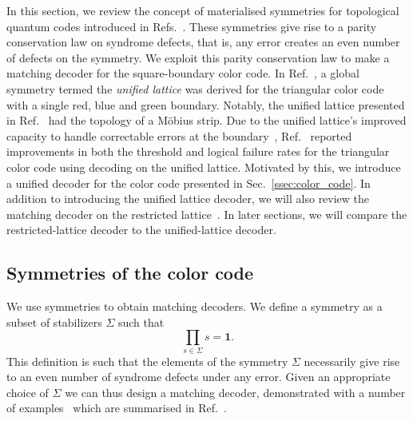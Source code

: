 \documentclass[a4paper,twocolumn,11pt,accepted=2024-12-23]{quantumarticle}
\begin{document}
In this section, we review the concept of materialised symmetries for topological quantum codes introduced in Refs.~\cite{kitaev2003fault, brown2020parallelized, sahay2022decoder,brown2022conservation}. These symmetries give rise to a parity conservation law on syndrome defects, that is, any error creates an even number of defects on the symmetry. We exploit this parity conservation law to make a matching decoder for the square-boundary color code. In Ref.~\cite{sahay2022decoder}, a global symmetry termed the \textit{unified lattice} was derived for the triangular color code with a single red, blue and green boundary. Notably, the unified lattice presented in Ref.~\cite{sahay2022decoder} had the topology of a M\"obius strip. Due to the unified lattice's improved capacity to handle correctable errors at the boundary~\cite{gidney2023newcircuitsopensource},  Ref.~\cite{sahay2022decoder} reported improvements in both the threshold and logical failure rates for the triangular color code using decoding on the unified lattice. Motivated by this, we introduce a unified decoder for the color code presented in Sec.~\ref{ssec:color_code}. In addition to introducing the unified lattice decoder, we will also review the matching decoder on the restricted lattice~\cite{Wang2010graphical, delfosse2014decoding, Chamberland_2020, Beverland2021cost, kubica2023efficient}. In later sections, we will compare the restricted-lattice decoder to the unified-lattice decoder.

\subsection{\label{ssec:symmetries} Symmetries of the color code}

We use symmetries to obtain matching decoders. We define a symmetry as a subset of stabilizers $\Sigma$ such that  
 \begin{equation}
   \prod_{s \in \Sigma} s = \mathbf{1}.
 \end{equation}
This definition is such that the elements of the symmetry $\Sigma$ necessarily give rise to an even number of syndrome defects under any error. Given an appropriate choice of $ \Sigma $ we can thus design a matching decoder, demonstrated with a number of examples~\cite{dennis2002topological, Wang2010graphical, delfosse2014decoding, Nickerson2019analysingcorrelated,  tuckett2020fault, bonilla2021xzzx, nixon2021correcting,Srivastava2022xyzhexagonal, sahay2022decoder, kubica2023efficient, Miguel2023cellularautomaton,  huang2022tailoring} which are summarised in Ref.~\cite{brown2022conservation}.
\end{document}

